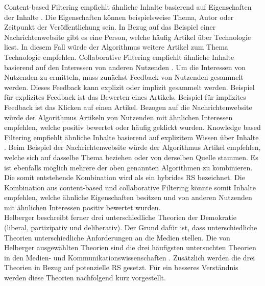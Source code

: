 Content-based Filtering empfiehlt ähnliche Inhalte basierend auf Eigenschaften der Inhalte \cite{content-based-rs}.
Die Eigenschaften können beispielsweise Thema, Autor oder Zeitpunkt der Veröffentlichung sein.
In Bezug auf das Beispiel einer Nachrichtenwebsite gibt es eine Person, welche häufig Artikel über Technologie liest.
In diesem Fall würde der Algorithmus weitere Artikel zum Thema Technologie empfehlen.
Collaborative Filtering empfiehlt ähnliche Inhalte basierend auf den Interessen von anderen Nutzenden \cite{collaborative-filtering-rs}.
Um die Interessen von Nutzenden zu ermitteln, muss zunächst Feedback von Nutzenden gesammelt werden.
Dieses Feedback kann explizit oder implizit gesammelt werden.
Beispiel für explizites Feedback ist das Bewerten eines Artikels.
Beispiel für implizites Feedback ist das Klicken auf einen Artikel.
Bezogen auf die Nachrichtenwebsite würde der Algorithmus Artikeln von Nutzenden mit ähnlichen Interessen empfehlen, welche positiv bewertet oder häufig geklickt wurden.
Knowledge based Filtering empfiehlt ähnliche Inhalte basierend auf explizitem Wissen über Inhalte \cite{knowledge-based-rs}.
Beim Beispiel der Nachrichtenwebsite würde der Algorithmus Artikel empfehlen, welche sich auf dasselbe Thema beziehen oder von derselben Quelle stammen.
Es ist ebenfalls möglich mehrere der oben genannten Algorithmen zu kombinieren.
Die somit entstehende Kombination wird als ein hybrides \ac{RS} bezeichnet.
Die Kombination aus content-based und collaborative Filtering könnte somit Inhalte empfehlen, welche ähnliche Eigenschaften besitzen und von anderen Nutzenden mit ähnlichen Interessen positiv bewertet wurden.\\

Helberger beschreibt ferner drei unterschiedliche Theorien der Demokratie (liberal, partizipativ und deliberativ).
Der Grund dafür ist, dass unterschiedliche Theorien unterschiedliche Anforderungen an die Medien stellen.
Die von Helberger ausgewählten Theorien sind die drei häufigsten untersuchten Theorien in den Medien- und Kommunikationswissenschaften \cite{democratic-theories}.
Zusätzlich werden die drei Theorien in Bezug auf potenzielle \ac{RS} gesetzt.
Für ein besseres Verständnis werden diese Theorien nachfolgend kurz vorgestellt.\\

